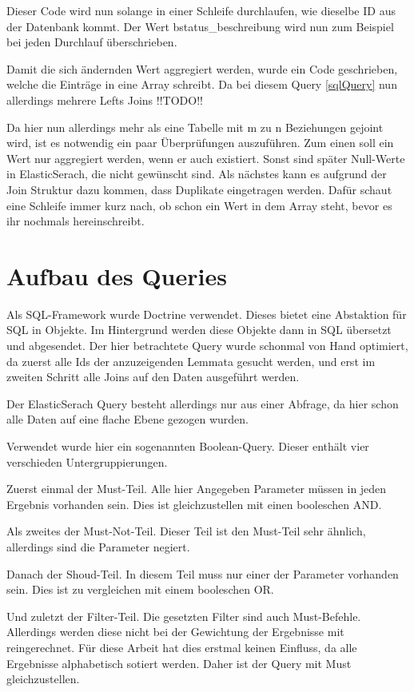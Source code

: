 Dieser Code wird nun solange in einer Schleife durchlaufen, wie dieselbe ID aus der Datenbank kommt. Der Wert bstatus\_beschreibung wird nun zum Beispiel bei jeden Durchlauf überschrieben. 

Damit die sich ändernden Wert aggregiert werden, wurde ein Code geschrieben, welche die Einträge in eine Array schreibt. Da bei diesem Query \ref{sqlQuery} nun allerdings mehrere Lefts Joins  !!TODO!!

Da hier nun allerdings mehr als eine Tabelle mit m zu n Beziehungen gejoint wird, ist es notwendig ein paar Überprüfungen auszuführen. Zum einen soll ein Wert nur aggregiert werden, wenn er auch existiert. Sonst sind später Null-Werte in ElasticSerach, die nicht gewünscht sind. Als nächstes kann es aufgrund der Join Struktur dazu kommen, dass Duplikate eingetragen werden. Dafür schaut eine Schleife immer kurz nach, ob schon ein Wert in dem Array steht, bevor es ihr nochmals hereinschreibt. 

\section{Aufbau des Queries}

Als SQL-Framework wurde Doctrine verwendet. Dieses bietet eine Abstaktion für SQL in Objekte. Im Hintergrund werden diese Objekte dann in SQL übersetzt und abgesendet. Der hier betrachtete Query wurde schonmal von Hand optimiert, da zuerst alle Ids der anzuzeigenden Lemmata gesucht werden, und erst im zweiten Schritt alle Joins auf den Daten ausgeführt werden.

Der ElasticSerach Query besteht allerdings nur aus einer Abfrage, da hier schon alle Daten auf eine flache Ebene gezogen wurden.

Verwendet wurde hier ein sogenannten Boolean-Query. Dieser enthält vier verschieden Untergruppierungen.

Zuerst einmal der Must-Teil. Alle hier Angegeben Parameter müssen in jeden Ergebnis vorhanden sein. Dies ist gleichzustellen mit einen booleschen AND. 

Als zweites der Must-Not-Teil. Dieser Teil ist den Must-Teil sehr ähnlich, allerdings sind die Parameter negiert.

Danach der Shoud-Teil. In diesem Teil muss nur einer der Parameter vorhanden sein. Dies ist zu vergleichen mit einem booleschen OR. 

Und zuletzt der Filter-Teil. Die gesetzten Filter sind auch Must-Befehle. Allerdings werden diese nicht bei der Gewichtung der Ergebnisse mit reingerechnet. Für diese Arbeit hat dies erstmal keinen Einfluss, da alle Ergebnisse alphabetisch sotiert werden. Daher ist der Query mit Must gleichzustellen. \cite{ElasticsearchB.V..17.12.2019}


